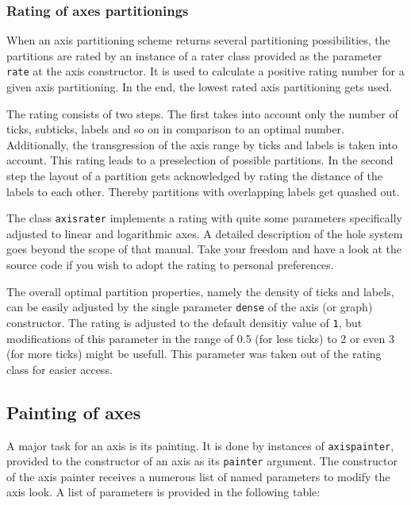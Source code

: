 \subsubsection{Rating of axes partitionings}

When an axis partitioning scheme returns several partitioning
possibilities, the partitions are rated by an instance of a rater
class provided as the parameter \verb|rate| at the axis constructor.
It is used to calculate a positive rating number for a given axis
partitioning. In the end, the lowest rated axis partitioning gets
used.

The rating consists of two steps. The first takes into account only
the number of ticks, subticks, labels and so on in comparison to an
optimal number. Additionally, the transgression of the axis range by
ticks and labels is taken into account. This rating leads to a
preselection of possible partitions. In the second step the layout of
a partition gets acknowledged by rating the distance of the labels to
each other. Thereby partitions with overlapping labels get quashed
out.

The class \verb|axisrater| implements a rating with quite some
parameters specifically adjusted to linear and logarithmic axes. A
detailed description of the hole system goes beyond the scope of that
manual. Take your freedom and have a look at the \PyX{} source code if
you wish to adopt the rating to personal preferences.

The overall optimal partition properties, namely the density of ticks
and labels, can be easily adjusted by the single parameter
\verb|dense| of the axis (or graph) constructor. The rating is
adjusted to the default densitiy value of \verb|1|, but modifications
of this parameter in the range of 0.5 (for less ticks) to 2 or even 3
(for more ticks) might be usefull. This parameter was taken out of the
rating class for easier access.

\subsection{Painting of axes}

A major task for an axis is its painting. It is done by instances of
\verb|axispainter|, provided to the constructor of an axis as its
\verb|painter| argument. The constructor of the axis painter receives
a numerous list of named parameters to modify the axis look. A list of
parameters is provided in the following table:

